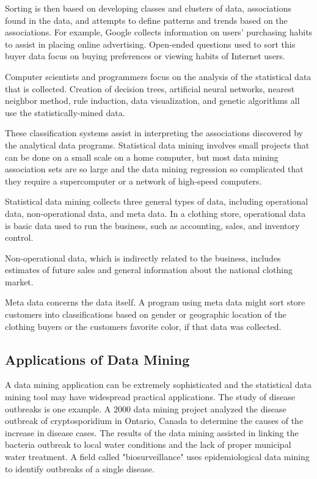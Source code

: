 \documentclass[11pt]{article} %
\begin{document}
Sorting is then based on developing classes and clusters of data, associations found in the data, and attempts to define patterns and trends based on the associations. For example, Google collects information on users' purchasing habits to assist in placing online advertising. Open-ended questions used to sort this buyer data focus on buying preferences or viewing habits of Internet users.


Computer scientists and programmers focus on the analysis of the statistical data that is collected. Creation of decision trees, artificial neural networks, nearest neighbor method, rule induction, data visualization, and genetic algorithms all use the statistically-mined data. 


These classification systems assist in interpreting the associations discovered by the analytical data programs. Statistical data mining involves small projects that can be done on a small scale on a home computer, but most data mining association sets are so large and the data mining regression so complicated that they require a supercomputer or a network of high-speed computers.


Statistical data mining collects three general types of data, including operational data, non-operational data, and meta data. In a clothing store, operational data is basic data used to run the business, such as accounting, sales, and inventory control. 


Non-operational data, which is indirectly related to the business, includes estimates of future sales and general information about the national clothing market. 


Meta data concerns the data itself. A program using meta data might sort store customers into classifications based on gender or geographic location of the clothing buyers or the customers favorite color, if that data was collected.


\subsection{Applications of Data Mining}

A data mining application can be extremely sophisticated and the statistical data mining tool may have widespread practical applications. The study of disease outbreaks is one example. A 2000 data mining project analyzed the disease outbreak of cryptosporidium in Ontario, Canada to determine the causes of the increase in disease cases. The results of the data mining assisted in linking the bacteria outbreak to local water conditions and the lack of proper municipal water treatment. A field called "biosurveillance" uses epidemiological data mining to identify outbreaks of a single disease.
\end{document}
